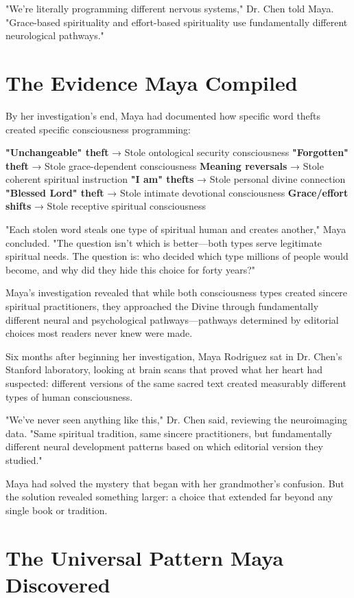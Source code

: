 \documentclass[11pt,twoside]{book}
\begin{document}
"We're literally programming different nervous systems," Dr. Chen told Maya. "Grace-based spirituality and effort-based spirituality use fundamentally different neurological pathways."
\section*{The Evidence Maya Compiled}
\label{sec:org9906ff1}

By her investigation's end, Maya had documented how specific word thefts created specific consciousness programming:

\textbf{\textbf{"Unchangeable" theft}} → Stole ontological security consciousness
\textbf{\textbf{"Forgotten" theft}} → Stole grace-dependent consciousness  
\textbf{\textbf{Meaning reversals}} → Stole coherent spiritual instruction
\textbf{\textbf{"I am" thefts}} → Stole personal divine connection
\textbf{\textbf{"Blessed Lord" theft}} → Stole intimate devotional consciousness
\textbf{\textbf{Grace/effort shifts}} → Stole receptive spiritual consciousness

"Each stolen word steals one type of spiritual human and creates another," Maya concluded. "The question isn't which is better—both types serve legitimate spiritual needs. The question is: who decided which type millions of people would become, and why did they hide this choice for forty years?"

Maya's investigation revealed that while both consciousness types created sincere spiritual practitioners, they approached the Divine through fundamentally different neural and psychological pathways—pathways determined by editorial choices most readers never knew were made.

Six months after beginning her investigation, Maya Rodriguez sat in Dr. Chen's Stanford laboratory, looking at brain scans that proved what her heart had suspected: different versions of the same sacred text created measurably different types of human consciousness.

"We've never seen anything like this," Dr. Chen said, reviewing the neuroimaging data. "Same spiritual tradition, same sincere practitioners, but fundamentally different neural development patterns based on which editorial version they studied."

Maya had solved the mystery that began with her grandmother's confusion. But the solution revealed something larger: a choice that extended far beyond any single book or tradition.
\section*{The Universal Pattern Maya Discovered}
\label{sec:org0e12dfa}
\end{document}
